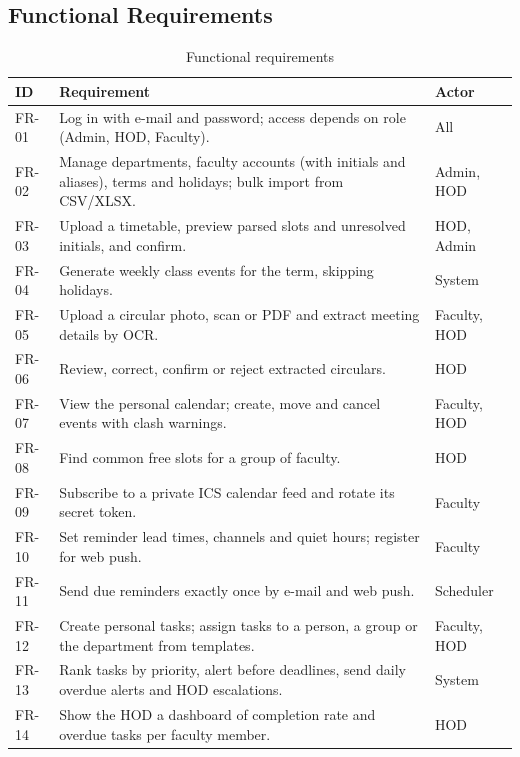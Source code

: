 \subsection{Functional Requirements}
\begin{xltabular}{\textwidth}{|p{1.4cm}|Y|p{2.6cm}|}
\caption{Functional requirements}\\
\hline
\textbf{ID} & \textbf{Requirement} & \textbf{Actor} \\ \hline
FR-01 & Log in with e-mail and password; access depends on role (Admin, HOD, Faculty). & All \\ \hline
FR-02 & Manage departments, faculty accounts (with initials and aliases), terms and holidays; bulk import from CSV/XLSX. & Admin, HOD \\ \hline
FR-03 & Upload a timetable, preview parsed slots and unresolved initials, and confirm. & HOD, Admin \\ \hline
FR-04 & Generate weekly class events for the term, skipping holidays. & System \\ \hline
FR-05 & Upload a circular photo, scan or PDF and extract meeting details by OCR. & Faculty, HOD \\ \hline
FR-06 & Review, correct, confirm or reject extracted circulars. & HOD \\ \hline
FR-07 & View the personal calendar; create, move and cancel events with clash warnings. & Faculty, HOD \\ \hline
FR-08 & Find common free slots for a group of faculty. & HOD \\ \hline
FR-09 & Subscribe to a private ICS calendar feed and rotate its secret token. & Faculty \\ \hline
FR-10 & Set reminder lead times, channels and quiet hours; register for web push. & Faculty \\ \hline
FR-11 & Send due reminders exactly once by e-mail and web push. & Scheduler \\ \hline
FR-12 & Create personal tasks; assign tasks to a person, a group or the department from templates. & Faculty, HOD \\ \hline
FR-13 & Rank tasks by priority, alert before deadlines, send daily overdue alerts and HOD escalations. & System \\ \hline
FR-14 & Show the HOD a dashboard of completion rate and overdue tasks per faculty member. & HOD \\ \hline
\end{xltabular}

